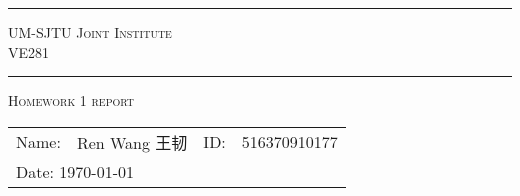 \begin{titlepage}
	\begin{center}
		\vspace*{2cm}

		\doublespacing
		\rule{\linewidth}{0.3mm}

		\textsc{
			\large
			UM-SJTU Joint Institute\\
			VE281
		}

		\rule{\linewidth}{0.3mm}


		\vspace*{3.5cm}

		{
			\Large
			\textsc{Homework 1 report}\\
		}

		\vspace*{0.2cm}




	\end{center}

	\vfill
	\normalsize

	\hspace*{1cm}
	\begin{minipage}{0.4\textwidth}
		\begin{tabular}{p{1.7cm}p{4cm}ll}
			Name: & Ren Wang \hspace*{0.6cm} {\fontspec{Hei}\selectfont 王韧} & ID: & 516370910177 \\
			\multicolumn{4}{l}{Date: \today}
		\end{tabular}
	\end{minipage}

\end{titlepage}